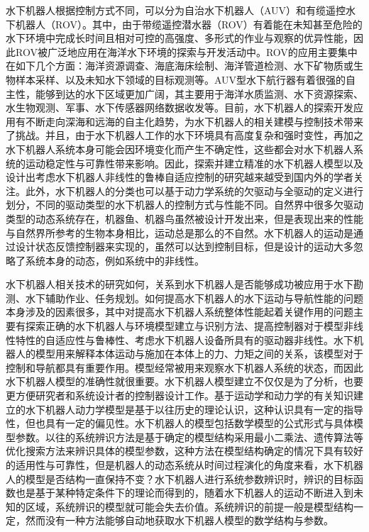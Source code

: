 水下机器人根据控制方式不同，可以分为自治水下机器人（AUV）和有缆遥控水下机器人（ROV）。其中，由于带缆遥控潜水器（ROV）有着能在未知甚至危险的水下环境中完成长时间且相对可控的高强度、多形式的作业与观察的优异性能，因此ROV被广泛地应用在海洋水下环境的探索与开发活动中。ROV的应用主要集中在如下几个方面：海洋资源调查、海底海床绘制、海洋管道检测、水下矿物质或生物样本采样、以及未知水下领域的目标观测等\cite{follestad2017autonomous,aguiar2007dynamic}。AUV型水下航行器有着很强的自主性，能够到达的水下区域更加广阔，其主要用于海洋水质监测、水下资源探索、水生物观测、军事、水下传感器网络数据收发等\cite{maalouf2013contribution}。目前，水下机器人的探索开发应用有不断走向深海和远海的自主化趋势，为水下机器人的相关建模与控制技术带来了挑战\cite{wangbiao2016,yangke2014,yangrui2015,aakre2016development}。并且，由于水下机器人工作的水下环境具有高度复杂和强时变性，再加之水下机器人系统本身可能会因环境变化而产生不确定性，这些都会对水下机器人系统的运动稳定性与可靠性带来影响。因此，探索并建立精准的水下机器人模型以及设计出考虑水下机器人非线性的鲁棒自适应控制的研究越来越受到国内外的学者关注\cite{yang2014modeling,haugen2012modeling,knausgaard2013development,eidsvik2015identification,eng2014added}。此外，水下机器人的分类也可以基于动力学系统的欠驱动与全驱动的定义进行划分，不同的驱动类型的水下机器人的控制方式与性能不同\cite{fantoni2002non,russdrakebook}。自然界中很多欠驱动类型的动态系统存在，机器鱼、机器鸟虽然被设计开发出来，但是表现出来的性能与自然界所参考的生物本身相比，运动总是那么的不自然\cite{russdrakebook}。水下机器人的运动是通过设计状态反馈控制器来实现的，虽然可以达到控制目标，但是设计的运动大多忽略了系统本身的动态，例如系统中的非线性\cite{russdrakebook,galeani2009tutorial}。

水下机器人相关技术的研究如何，关系到水下机器人是否能够成功被应用于水下勘测、水下辅助作业、任务规划\cite{Souza2007Intelligent}。如何提高水下机器人的水下运动与导航性能的问题本身涉及的因素很多，其中对提高水下机器人系统整体性能起着关键作用的问题主要有探索正确的水下机器人与环境模型建立与识别方法、提高控制器对于模型非线性特性的自适应性与鲁棒性、考虑水下机器人设备所具有的驱动器非线性\cite{yang2012observer,sarhadi2016adaptive2}。水下机器人的模型用来解释本体运动与施加在本体上的力、力矩之间的关系，该模型对于控制和导航都具有重要作用\cite{wu2016parametric}。模型经常被用来观察水下机器人系统的状态，而因此水下机器人模型的准确性就很重要。水下机器人模型建立不仅仅是为了分析，也要更方便研究者和系统设计者的控制器设计工作。基于运动学和动力学的有关知识建立的水下机器人动力学模型是基于以往历史的理论认识，这种认识具有一定的指导性，但也具有一定的偏见性\cite{menezes2014symbolic}。水下机器人的模型包括数学模型的公式形式与具体模型参数\cite{schmidt2009distilling}。以往的系统辨识方法是基于确定的模型结构采用最小二乘法、遗传算法等优化搜索方法来辨识具体的模型参数，这种方法在模型结构确定的情况下具有较好的适用性与可靠性，但是机器人的动态系统从时间过程演化的角度来看，水下机器人的模型是否结构一直保持不变\cite{John1978Methods}？水下机器人进行系统参数辨识时，辨识的目标函数也是基于某种特定条件下的理论而得到的，随着水下机器人的运动不断进入到未知的区域，系统辨识的模型就可能会失去价值。系统辨识的前提一般是模型结构一定，然而没有一种方法能够自动地获取水下机器人模型的数学结构与参数\cite{wu2016parametric}。

